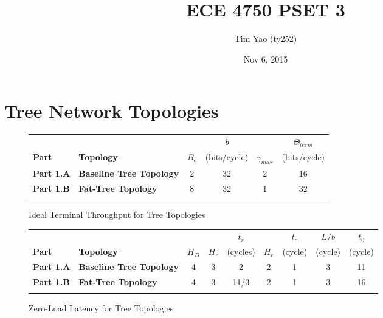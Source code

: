 \documentclass[10pt]{article}
\title{ECE 4750 PSET 3}
\author{Tim Yao (ty252)}
\date{Nov 6, 2015}
\begin{document}
\maketitle
\newcommand*{\tableindent}{\hspace*{0.3cm}}%

\section{Tree Network Topologies} 

\begin{figure}[H]
\centering
\begin{tabular}{@{\extracolsep{3pt}}llcccc@{}}
\Xhline{2\arrayrulewidth}
& & & \textit{b} & & $\Theta_{term}$ \\
\textbf{Part} & \textbf{Topology} & $B_c$ & {(bits/cycle)} & $\gamma_{max}$ & {(bits/cycle)} \\
\hline
\textbf{Part 1.A} & \textbf{Baseline Tree Topology} & 2 & 32 & 2 & 16 \\
\hline
\textbf{Part 1.B} & \textbf{Fat-Tree Topology} & 8 & 32 & 1 & 32  \\
\Xhline{2\arrayrulewidth}
\end{tabular}
\caption{Ideal Terminal Throughput for Tree Topologies}
\end{figure}

\begin{figure}[H]
\centering
\begin{tabular}{@{\extracolsep{3pt}}llccccccc@{}}
\Xhline{2\arrayrulewidth}
& & & & \textit{$t_r$} & & \textit{$t_c$} & \textit{$L/b$} & \textit{$t_0$}\\
\textbf{Part} & \textbf{Topology} & \textit{$H_D$} & \textit{$H_r$} & (cycles) & \textit{$H_c$} & (cycle) & (cycle) & (cycle) \\
\hline
\textbf{Part 1.A} & \textbf{Baseline Tree Topology} & 4 & 3 & 2 & 2 & 1 & 3 & 11\\
\hline
\textbf{Part 1.B} & \textbf{Fat-Tree Topology} & 4 & 3 & 11/3 & 2 & 1 & 3 & 16\\
\Xhline{2\arrayrulewidth}
\end{tabular}
\caption{Zero-Load Latency for Tree Topologies}
\end{figure}
\end{document}
